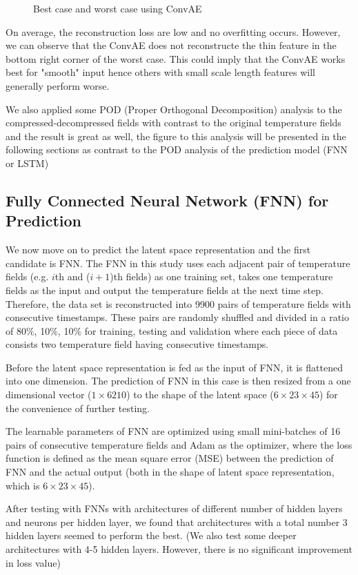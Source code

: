 \begin{figure}[H]
\caption{Best case and worst case using ConvAE}
\label{fig:figures}
\end{figure}


On average, the reconstruction loss are low and no overfitting occurs. However, we can observe that the ConvAE does not reconstructe the thin feature in the bottom right corner of the worst case. This could imply that the ConvAE works best for "smooth" input hence others with small scale length features will generally perform worse.

We also applied some POD (Proper Orthogonal Decomposition) analysis to the compressed-decompressed fields with contrast to the original temperature fields and the result is great as well, the figure to this analysis will be presented in the following sections as contrast to the POD analysis of the prediction model (FNN or LSTM) 


\subsection{Fully Connected Neural Network (FNN) for Prediction}

We now move on to predict the latent space representation and the first candidate is FNN. The FNN in this study uses each adjacent pair of temperature fields (e.g. $i$th and ($i+1$)th fields) as one training set, takes one temperature fields as the input and output the temperature fields at the next time step. Therefore, the data set is reconstructed into 9900 pairs of temperature fields with consecutive timestamps. These pairs are randomly shuffled and divided in a ratio of 80\%, 10\%, 10\% for training, testing and validation where each piece of data consists two temperature field having consecutive timestamps.

Before the latent space representation is fed as the input of FNN, it is flattened into one dimension. The prediction of FNN in this case is then resized from a one dimensional vector ($1 \times 6210$) to the shape of the latent space ($6 \times 23 \times 45$) for the convenience of further testing.

The learnable parameters of FNN are optimized using small mini-batches of 16 pairs of consecutive temperature fields and Adam as the optimizer, where the loss function is defined as the mean square error (MSE) between the prediction of FNN and the actual output (both in the shape of latent space representation, which is $6 \times 23 \times 45$).

After testing with FNNs with architectures of different number of hidden layers and neurons per hidden layer, we found that architectures with a total number 3 hidden layers seemed to perform the best. (We also test some deeper architectures with 4-5 hidden layers. However, there is no significant improvement in loss value)

